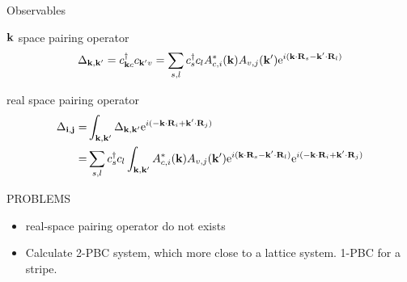 \documentclass{beamer}
\begin{document}
\begin{frame}{Observables}
	\begin{definition}{$\vb{k}$ space pairing operator}
		\begin{equation*}
			\Delta _{\vb{k,k'}} = c^\dagger_{\vb{k}c}c_{\vb{k'}v}
			 = \sum_{s,l}c^\dagger_sc_l A_{c,i}^*(\vb{k})A_{v,j}(\vb{k'})\mathrm{e}^{i(\vb{k}\cdot \vb{R}_s-\vb{k'}\cdot \vb{R}_l)}
		\end{equation*}
	\end{definition}
	\begin{definition}{real space pairing operator}
		\begin{align*}
			\Delta _{\vb{i,j}} =& \int_{\vb{k,k'}}\Delta_{\vb{k,k'}}\mathrm{e}^{i(-\vb{k}\cdot \vb{R}_i+\vb{k'}\cdot \vb{R}_j)}\\
			=&\sum_{s,l}c^\dagger_sc_l\int_{\vb{k,k'}}A_{c,i}^*(\vb{k})A_{v,j}(\vb{k'})\mathrm{e}^{i(\vb{k}\cdot \vb{R}_s-\vb{k'}\cdot \vb{R}_l)}\mathrm{e}^{i(-\vb{k}\cdot \vb{R}_i+\vb{k'}\cdot \vb{R}_j)}
		\end{align*}
	\end{definition}
\end{frame}

\begin{frame}{PROBLEMS}
	\begin{itemize}
		\item real-space pairing operator do not exists
		\item Calculate 2-PBC system, which more close to a lattice system. 1-PBC for a stripe.
	\end{itemize}
\end{frame}
\end{document}
